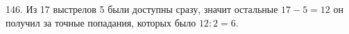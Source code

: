 146. Из 17 выстрелов 5 были доступны сразу, значит остальные $17-5=12$ он получил за точные попадания, которых было $12:2=6.$\\
